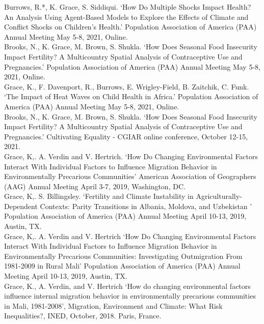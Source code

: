 \documentclass[11pt]{article} %
\begin{document}
\noindent
Burrows, R.*, K. Grace, S. Siddiqui. `How Do Multiple Shocks Impact Health? An Analysis Using Agent-Based Models to Explore the Effects of Climate and Conflict Shocks on Children’s Health.' Population Association of America (PAA) Annual Meeting May 5-8, 2021, Online.\\

\noindent
Brooks, N., K. Grace, M. Brown, S. Shukla. `How Does Seasonal Food Insecurity Impact Fertility? A Multicountry Spatial Analysis of Contraceptive Use and Pregnancies.' Population Association of America (PAA) Annual Meeting May 5-8, 2021, Online.\\

\noindent
Grace, K., F. Davenport, R., Burrows, E. Wrigley-Field, B. Zaitchik, C. Funk. `The Impact of Heat Waves on Child Health in Africa.' Population Association of America (PAA) Annual Meeting May 5-8, 2021, Online.\\

\noindent
Brooks, N., K. Grace, M. Brown, S. Shukla. `How Does Seasonal Food Insecurity Impact Fertility? A Multicountry Spatial Analysis of Contraceptive Use and Pregnancies.' Cultivating Equality - CGIAR online conference, October 12-15, 2021.\\

\noindent
Grace, K,. A. Verdin and V. Hertrich. `How Do Changing Environmental Factors Interact With Individual Factors to Influence Migration Behavior in Environmentally Precarious Communities'  American Association of Geographers (AAG) Annual Meeting April 3-7, 2019, Washington, DC.\\

\noindent
Grace, K,. S. Billingsley. `Fertility and Climate Instability in Agriculturally-Dependent Contexts: Parity Transitions in Albania, Moldova, and Uzbekistan ' Population Association of America (PAA) Annual Meeting April 10-13, 2019, Austin, TX.\\

\noindent
Grace, K,. A. Verdin and V. Hertrich `How Do Changing Environmental Factors Interact With Individual Factors to Influence Migration Behavior in Environmentally Precarious Communities: Investigating Outmigration From 1981-2009 in Rural Mali' Population Association of America (PAA) Annual Meeting April 10-13, 2019, Austin, TX.\\

\noindent 
Grace, K., A. Verdin, and V. Hertrich `How do changing environmental factors influence internal migration behavior in environmentally precarious communities in Mali, 1981-2008', Migration, Environment and Climate: What Risk Inequalities?, INED, October, 2018.  Paris, France. \\
\end{document}
